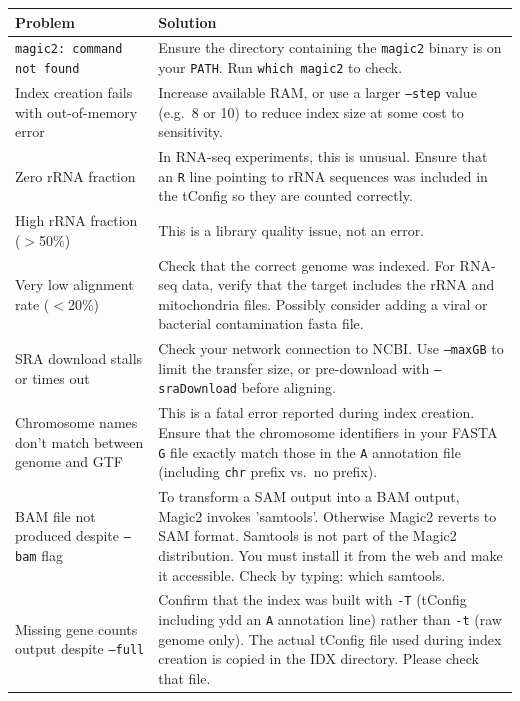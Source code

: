 \documentclass[11pt]{article}
\newcommand{\code}[1]{\texttt{#1}}
\begin{document}
\begin{center}
\begin{longtable}{p{5.5cm} p{9cm}}
\toprule
\textbf{Problem} & \textbf{Solution} \\
\midrule
\endhead

\code{magic2: command not found}
  & Ensure the directory containing the \code{magic2} binary is on your
    \code{PATH}.  Run \code{which magic2} to check. \\[4pt]

Index creation fails with out-of-memory error
  & Increase available RAM, or use a larger \code{--step} value (e.g.\
    8 or 10) to reduce index size at some cost to sensitivity. \\[4pt]

Zero rRNA fraction
  & In RNA-seq experiments, this is unusual.  Ensure that an
    \code{R} line pointing to rRNA sequences was included in the
    tConfig so they are counted correctly. \\[4pt]

High rRNA fraction ($>$50\%)
  & This is a library quality issue, not an error. \\[4pt]

Very low alignment rate ($<$20\%)
  & Check that the correct genome was indexed.  For RNA-seq data,
    verify that the target includes the rRNA and mitochondria files.
    Possibly consider adding a viral or bacterial contamination fasta file. \\[4pt]

SRA download stalls or times out
  & Check your network connection to NCBI.  Use \code{--maxGB} to
    limit the transfer size, or pre-download with \code{--sraDownload}
    before aligning. \\[4pt]

Chromosome names don't match between genome and GTF
  & This is a fatal error reported during index creation.
    Ensure that the chromosome identifiers in your FASTA \code{G} file
    exactly match those in the \code{A} annotation file (including
    \code{chr} prefix vs.\ no prefix). \\[4pt]

BAM file not produced despite \code{--bam} flag
& To transform a SAM output into a BAM output, Magic2 invokes 'samtools'.
Otherwise Magic2 reverts to SAM format.
Samtools is not part of the Magic2 distribution. You must install it from the web
and make it accessible. Check by typing: which samtools.\\[4pt]

Missing gene counts output despite \code{--full}
  & Confirm that the index was built with \code{-T} (tConfig including
ydd    an \code{A} annotation line) rather than \code{-t} (raw genome only).
    The actual tConfig file used during index creation is copied in the
    IDX directory. Please check that file.\\

\bottomrule
\end{longtable}
\end{center}
\end{document}
